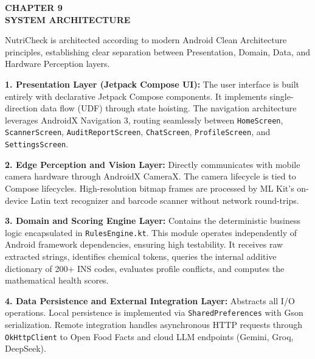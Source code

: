 \documentclass[12pt]{article}
\begin{document}
\vspace{1cm}

\newpage
\begin{center}
\textbf{\Large CHAPTER 9}\\[0.5cm]
\textbf{\Large SYSTEM ARCHITECTURE}\\[1cm]
\end{center}

\noindent
NutriCheck is architected according to modern Android Clean Architecture principles, establishing clear separation between Presentation, Domain, Data, and Hardware Perception layers.

\vspace{0.3cm}

\noindent
\textbf{1. Presentation Layer (Jetpack Compose UI):}
The user interface is built entirely with declarative Jetpack Compose components. It implements single-direction data flow (UDF) through state hoisting. The navigation architecture leverages AndroidX Navigation 3, routing seamlessly between \texttt{HomeScreen}, \texttt{ScannerScreen}, \texttt{AuditReportScreen}, \texttt{ChatScreen}, \texttt{ProfileScreen}, and \texttt{SettingsScreen}.

\vspace{0.3cm}

\noindent
\textbf{2. Edge Perception and Vision Layer:}
Directly communicates with mobile camera hardware through AndroidX CameraX. The camera lifecycle is tied to Compose lifecycles. High-resolution bitmap frames are processed by ML Kit's on-device Latin text recognizer and barcode scanner without network round-trips.

\vspace{0.3cm}

\noindent
\textbf{3. Domain and Scoring Engine Layer:}
Contains the deterministic business logic encapsulated in \texttt{RulesEngine.kt}. This module operates independently of Android framework dependencies, ensuring high testability. It receives raw extracted strings, identifies chemical tokens, queries the internal additive dictionary of 200+ INS codes, evaluates profile conflicts, and computes the mathematical health scores.

\vspace{0.3cm}

\noindent
\textbf{4. Data Persistence and External Integration Layer:}
Abstracts all I/O operations. Local persistence is implemented via \texttt{SharedPreferences} with Gson serialization. Remote integration handles asynchronous HTTP requests through \texttt{OkHttpClient} to Open Food Facts and cloud LLM endpoints (Gemini, Groq, DeepSeek).
\end{document}

